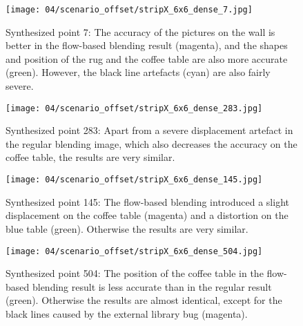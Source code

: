 
\begin{figure}
  \centering
  \texttt{[image: 04/scenario\_offset/stripX\_6x6\_dense\_7.jpg]}
  \caption[Viewpoint 7 of 625 in the square room]{Synthesized point 7: The accuracy of the pictures on the wall is better in the flow-based blending result (magenta), and the shapes and position of the rug and the coffee table are also more accurate (green). However, the black line artefacts (cyan) are also fairly severe.}
  \label{fig:offset_7}
\end{figure}


\begin{figure}
  \centering
  \texttt{[image: 04/scenario\_offset/stripX\_6x6\_dense\_283.jpg]}
  \caption[Viewpoint 283 of 625 in the square room]{Synthesized point 283: Apart from a severe displacement artefact in the regular blending image, which also decreases the accuracy on the coffee table, the results are very similar.}
  \label{fig:offset_283}
\end{figure}

\begin{figure}
  \centering
  \texttt{[image: 04/scenario\_offset/stripX\_6x6\_dense\_145.jpg]}
  \caption[Viewpoint 145 of 625 in the square room]{Synthesized point 145: The flow-based blending introduced a slight displacement on the coffee table (magenta) and a distortion on the blue table (green). Otherwise the results are very similar.}
  \label{fig:offset_145}
\end{figure}

\begin{figure}
  \centering
  \texttt{[image: 04/scenario\_offset/stripX\_6x6\_dense\_504.jpg]}
  \caption[Viewpoint 504 of 625 in the square room]{Synthesized point 504: The position of the coffee table in the flow-based blending result is less accurate than in the regular result (green). Otherwise the results are almost identical, except for the black lines caused by the external library bug (magenta).}
  \label{fig:offset_504}
\end{figure}

